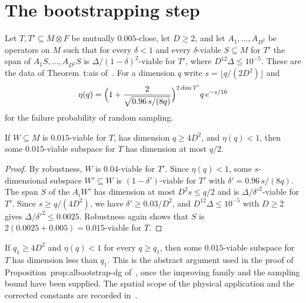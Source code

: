 \section{The bootstrapping step}

Let $T,T'\subseteq M\otimes F$ be mutually $0.005$-close, let $D\ge2$, and let
$A_1,\dots,A_{D^2}$ be operators on $M$ such that for every $\delta<1$ and
every $\delta$-viable $S\subseteq M$ for $T'$ the span of $A_1S,\dots,A_{D^2}S$
is $\Delta/(1-\delta)^2$-viable for $T'$, where $D^{12}\Delta\le10^{-5}$. These
are the data of Theorem~t:ais of~\cite[lines 1010--1024]{Arad2016RigorousRG}.
For a dimension $q$ write $s=\lfloor q/(2D^2)\rfloor$ and
\[
    \eta(q)=\Bigl(1+\frac{2}{\sqrt{0.96\,s/(8q)}}\Bigr)^{2\dim T'}q\,e^{-s/16}
\]
for the failure probability of random sampling.

\begin{theorem}
    \label{thm:viable_bootstrap_step}
    \leanok
    If $W\subseteq M$ is $0.015$-viable for $T$, has dimension $q\ge4D^2$, and
    $\eta(q)<1$, then some $0.015$-viable subspace for $T$ has dimension at
    most $q/2$.
\end{theorem}

\begin{proof}
    \leanok
    By robustness, $W$ is $0.04$-viable for $T'$. Since $\eta(q)<1$, some
    $s$-dimensional subspace $W'\subseteq W$ is $(1-\delta')$-viable for $T'$
    with $\delta'=0.96\,s/(8q)$. The span $S$ of the $A_iW'$ has dimension at
    most $D^2s\le q/2$ and is $\Delta/\delta'^2$-viable for $T'$. Since
    $s\ge q/(4D^2)$, we have $\delta'\ge0.03/D^2$, and $D^{12}\Delta\le10^{-5}$
    with $D\ge2$ gives $\Delta/\delta'^2\le0.0025$. Robustness again shows
    that $S$ is $2(0.0025+0.005)=0.015$-viable for $T$.
\end{proof}

\begin{theorem}[Bootstrapping]
    \label{thm:viable_bootstrap}
    \leanok
    If $q_1\ge4D^2$ and $\eta(q)<1$ for every $q\ge q_1$, then some
    $0.015$-viable subspace for $T$ has dimension less than $q_1$.
    This is the abstract argument used in the proof of
    Proposition~prop:albootstrap-dg of~\cite[lines
        1062--1075]{Arad2016RigorousRG}, once the improving family and the
    sampling bound have been supplied. The spatial scope of the physical
    application and the corrected constants are recorded
    in~\cite{gap:alvv16_bootstrap_constants}.
\end{theorem}

